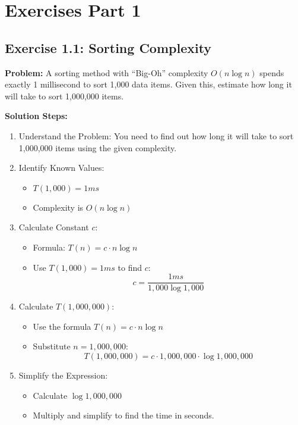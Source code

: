 \clearpage
\section{Exercises Part 1}

\subsection{Exercise 1.1: Sorting Complexity}
\textbf{Problem:} A sorting method with “Big-Oh” complexity $O(n \log n)$ spends exactly 1 millisecond to sort 1,000 data items. Given this, estimate how long it will take to sort 1,000,000 items.

\vspace{0.5em}
\textbf{Solution Steps:}
\begin{enumerate}[leftmargin=*,noitemsep]
    \item Understand the Problem: You need to find out how long it will take to sort 1,000,000 items using the given complexity.
    \item Identify Known Values:
    \begin{itemize}
        \item $T(1,000) = 1ms$
        \item Complexity is $O(n \log n)$
    \end{itemize}
    \item Calculate Constant $c$:
    \begin{itemize}
        \item Formula: $T(n) = c \cdot n \log n$
        \item Use $T(1,000) = 1ms$ to find $c$:
        \[ c = \frac{1ms}{1,000 \log 1,000} \]
    \end{itemize}
    \item Calculate $T(1,000,000)$:
    \begin{itemize}
        \item Use the formula $T(n) = c \cdot n \log n$
        \item Substitute $n = 1,000,000$:
        \[ T(1,000,000) = c \cdot 1,000,000 \cdot \log 1,000,000 \]
    \end{itemize}
    \item Simplify the Expression:
    \begin{itemize}
        \item Calculate $\log 1,000,000$
        \item Multiply and simplify to find the time in seconds.
    \end{itemize}
\end{enumerate}

